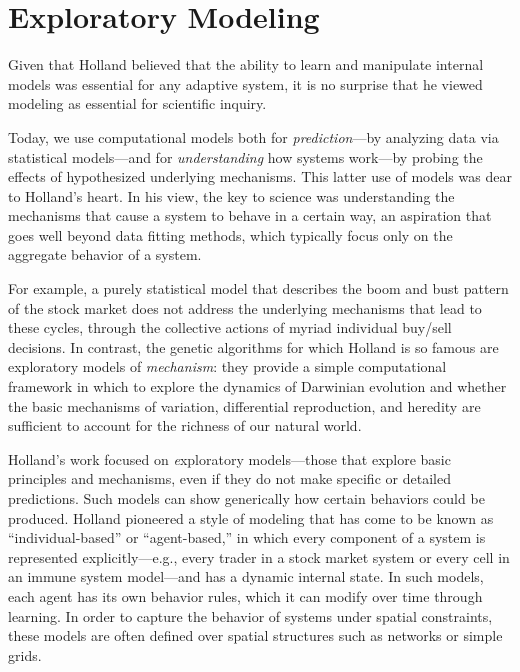 \documentclass{sig-alternate}
\begin{document}

\section{Exploratory Modeling}

Given that Holland believed that the ability to learn and manipulate
internal models was essential for any adaptive system, it is no
surprise that he viewed modeling as essential for scientific inquiry.


Today, we use computational models both for \emph{prediction}---by
analyzing data via statistical models---and for \emph{understanding}
how systems work---by probing the effects of hypothesized underlying
mechanisms.  This latter use of models was dear to Holland's heart.
In his view, the key to science was understanding the mechanisms that
cause a system to behave in a certain way, an aspiration that goes
well beyond data fitting methods, which typically focus only on
the aggregate behavior of a system.  

For example, a purely statistical model that describes the boom and bust
pattern of the stock market
does not address the underlying mechanisms
that lead to these cycles, through the collective actions of myriad
individual buy/sell decisions.  
In contrast, the genetic algorithms for which Holland is so famous
are exploratory models of \emph{mechanism}: they provide a simple
computational framework in which to explore the dynamics of Darwinian
evolution and whether the basic mechanisms of variation, differential
reproduction, and heredity are sufficient to account for the richness
of our natural world.

Holland's work focused on {\emph exploratory} models---those that explore basic principles and
mechanisms, even if they do not make specific or detailed
predictions.  Such models can show generically how certain behaviors
could be produced.  Holland pioneered a style of modeling that has
come to be known as ``individual-based'' or ``agent-based,'' in which
every component of a system is represented explicitly---e.g., every
trader in a stock market system or every cell in an immune system
model---and has a dynamic internal state. In such models, each agent has
its own behavior rules, which it can modify over time through learning.  In
order to capture the behavior of systems under spatial
constraints, these models are often defined over spatial structures
such as networks or simple grids.
\end{document}
